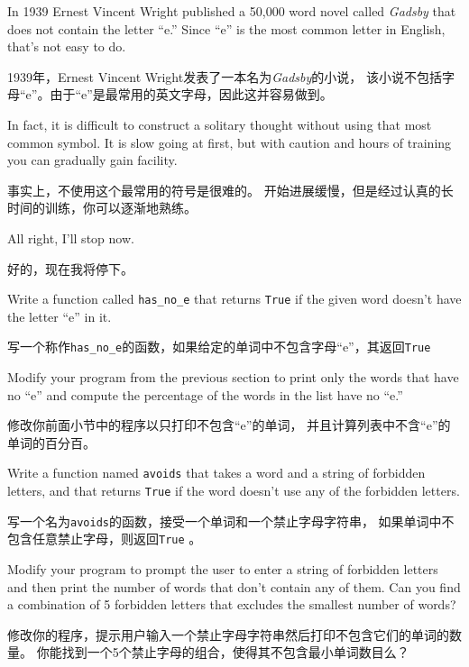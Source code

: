 \documentclass[10pt]{book}
\begin{document}
\begin{CJK}{UTF8}{gbsn}
\begin{exercise}
In 1939 Ernest Vincent Wright published a 50,000 word novel called
{\em Gadsby} that does not contain the letter ``e.''  Since ``e'' is
the most common letter in English, that's not easy to do.

1939年，Ernest Vincent Wright发表了一本名为{\em Gadsby}的小说，
该小说不包括字母``e''。由于``e''是最常用的英文字母，因此这并容易做到。

In fact, it is difficult to construct a solitary thought without using
that most common symbol.  It is slow going at first, but with caution
and hours of training you can gradually gain facility.

事实上，不使用这个最常用的符号是很难的。
开始进展缓慢，但是经过认真的长时间的训练，你可以逐渐地熟练。

All right, I'll stop now.

好的，现在我将停下。

Write a function called \verb"has_no_e" that returns {\tt True} if
the given word doesn't have the letter ``e'' in it.

写一个称作\verb"has_no_e"的函数，如果给定的单词中不包含字母``e''，其返回{\tt True}

Modify your program from the previous section to print only the words
that have no ``e'' and compute the percentage of the words in the list
have no ``e.''

修改你前面小节中的程序以只打印不包含``e''的单词，
并且计算列表中不含``e''的单词的百分百。

\end{exercise}


\begin{exercise} 

Write a function named {\tt avoids}
that takes a word and a string of forbidden letters, and
that returns {\tt True} if the word doesn't use any of the forbidden
letters.

写一个名为{\tt avoids}的函数，接受一个单词和一个禁止字母字符串，
如果单词中不包含任意禁止字母，则返回{\tt True} 。

Modify your program to prompt the user to enter a string
of forbidden letters and then print the number of words that
don't contain any of them.
Can you find a combination of 5 forbidden letters that
excludes the smallest number of words?

修改你的程序，提示用户输入一个禁止字母字符串然后打印不包含它们的单词的数量。
你能找到一个5个禁止字母的组合，使得其不包含最小单词数目么？

\end{exercise}




\end{CJK}
\end{document}
